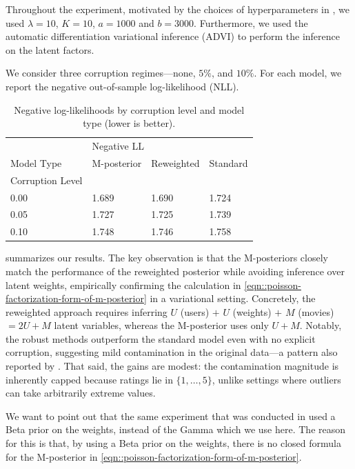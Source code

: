 \documentclass[11pt, oneside]{amsart}
\theoremstyle{definition}   %
\begin{document}
Throughout the experiment, motivated by the choices of hyperparameters in \cite{wang:kucukelbir:blei2017}, we used \( \lambda = 10\), \(K = 10\), \( a = 1000\) and \(b= 3000\). Furthermore, we used the automatic differentiation variational inference (ADVI) \citep{ADVI} to perform the inference on the latent factors. 

We consider three corruption regimes—none, \(5\%\), and \(10\%\). For each model, we report the negative out-of-sample log-likelihood (NLL).
%
\begin{table}[H]
\centering
\caption{Negative log-likelihoods by corruption level and model type (lower is better).}
\label{tab:neg_ll}
\begin{tabular}{llll}
\toprule
{} & \multicolumn{3}{l}{Negative LL} \\
Model Type & M-posterior & Reweighted & Standard \\
Corruption Level & & & \\
\midrule
0.00 & 1.689 & 1.690 & 1.724 \\
0.05 & 1.727 & 1.725 & 1.739 \\
0.10 & 1.748 & 1.746 & 1.758 \\
\bottomrule
\end{tabular}
\end{table}

 summarizes our results. The key observation is that the M-posteriors closely match the performance of the reweighted posterior while avoiding inference over latent weights, empirically confirming the calculation in \eqref{eqn::poisson-factorization-form-of-m-posterior} in a variational setting. Concretely, the reweighted approach requires inferring $U$ (users) $+$ $U$ (weights) $+$ $M$ (movies) $= 2U+M$ latent variables, whereas the M-posterior uses only $U+M$. Notably, the robust methods outperform the standard model even with no explicit corruption, suggesting mild contamination in the original data—a pattern also reported by \citet{wang:kucukelbir:blei2017}. That said, the gains are modest: the contamination magnitude is inherently capped because ratings lie in $\{1,\dots,5\}$, unlike settings where outliers can take arbitrarily extreme values.

We want to point out that the same experiment that was conducted in \cite{wang:kucukelbir:blei2017} used a Beta prior on the weights, instead of the Gamma which we use here. The reason for this is that, by using a Beta prior on the weights, there is no closed formula for the M-posterior in \eqref{eqn::poisson-factorization-form-of-m-posterior}.
\end{document}
